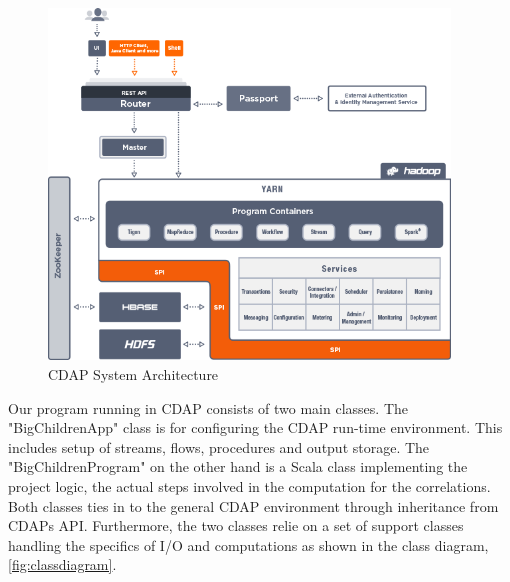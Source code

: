\documentclass[
10pt, %
a4paper, %
oneside, %
headinclude,footinclude, %
useAMS,
usenatbib
]{mn2e}  %
\begin{document}
\begin{figure}
  \centering
  \includegraphics[width=0.95\textwidth]{Diag_Architecture}
  \caption{CDAP System Architecture}
  \label{fig:cdapsystem}
\end{figure}

Our program running in CDAP consists of two main classes. The "BigChildrenApp" class is for configuring the CDAP run-time environment. This includes setup of streams, flows, procedures and output storage. The "BigChildrenProgram" on the other hand is a Scala class implementing the project logic, the actual steps involved in the computation for the correlations. Both classes ties in to the general CDAP environment through inheritance from CDAPs API. Furthermore, the two classes relie on a set of support classes handling the specifics of I/O and computations as shown in the class diagram, \ref{fig:classdiagram}.
\end{document}
